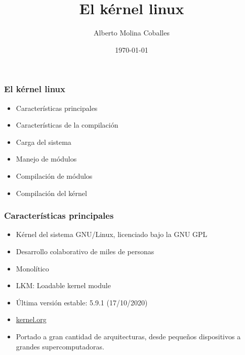 \documentclass{beamer}
\author{Alberto Molina Coballes}
\title{El kérnel linux}
\institute{IES Gonzalo Nazareno}
\date{\today}
\begin{document}
\begin{frame}[t,plain]
\titlepage
\end{frame}

\begin{frame} \frametitle{El kérnel linux}
  \begin{itemize}
  \item Características principales
  \item Características de la compilación
  \item Carga del sistema
  \item Manejo de módulos
  \item Compilación de módulos
  \item Compilación del kérnel
  \end{itemize}  
\end{frame}

\begin{frame} \frametitle{Características principales}
  \begin{itemize}
  \item Kérnel del sistema GNU/Linux, licenciado bajo la GNU GPL
  \item Desarrollo colaborativo de miles de personas
  \item Monolítico
  \item LKM: Loadable kernel module
  \item Última versión estable: 5.9.1 (17/10/2020)
  \item \url{kernel.org}
  \item Portado a gran cantidad de arquitecturas, desde pequeños
    dispositivos a grandes supercomputadoras.
  \end{itemize}
\end{frame}
\end{document}

